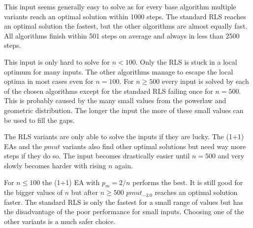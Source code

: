 This input seems generally easy to solve as for every base algorithm multiple variants reach an optimal solution within 1000 steps.
The standard RLS reaches an optimal solution the fastest, but the other algorithms are almost equally fast.
All algorithms finish within 501 steps on average and always in less than 2500 steps.



This input is only hard to solve for $n<100$.
Only the RLS is stuck in a local optimum for many inputs.
The other algorithms manage to escape the local optima in most cases even for $n=100$.
For $n\ge500$ every input is solved by each of the chosen algorithms except for the standard RLS failing once for $n=500$.
This is probably caused by the many small values from the powerlaw and geometric distribution.
The longer the input the more of these small values can be used to fill the gaps.



The RLS variants are only able to solve the inputs if they are lucky.
The (1+1) EAs and the $pmut$ variants also find other optimal solutions but need way more steps if they do so.
The input becomes drastically easier until $n=500$ and very slowly becomes harder with rising $n$ again.



For $n\le100$ the (1+1) EA with $p_m=2/n$ performs the best.
It is still good for the bigger values of $n$ but after $n\ge500$ $pmut_{-3.0}$ reaches an optimal solution faster.
The standard RLS is only the fastest for a small range of values but has the disadvantage of the poor performance for small inputs.
Choosing one of the other variants is a much safer choice.